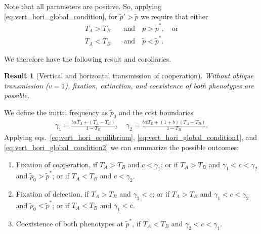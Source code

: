 \documentclass[12pt]{extarticle}
\newtheorem{result}{Result}
\begin{document}
{Note that all parameters are positive.
So, applying \autoref{eq:vert_hori_global_condition}, for $\tilde{p}'>\tilde{p}$ we require that either 
\begin{align} 
\label{eq:vert_hori_global_condition1}
T_A > T_B \quad&\text{and}\quad \tilde{p}>\tilde{p}^*,  \quad \text{or} \\
\label{eq:vert_hori_global_condition2}
T_A <T_B \quad&\text{and}\quad \tilde{p}<\tilde{p}^* .
\end{align}

We therefore have the following result and corollaries.\\

\begin{result}[Vertical and horizontal transmission of cooperation] \label{result:vert_hori}
Without oblique transmission ($v=1$), fixation, extinction, and coexistence of both phenotypes are possible.
\end{result}

We define the initial frequency as $\tilde{p}_0$ and the cost boundaries
\begin{equation}\begin{aligned}
\gamma_1 = \frac{b \alpha T_A + (T_A - T_B)}{1-T_B}, \quad
\gamma_2 = \frac{b \alpha T_B + (1+b) (T_A - T_B)}{1-T_B}.
\end{aligned}\end{equation}
Applying eqs.~\ref{eq:vert_hori_equilibrium}, \ref{eq:vert_hori_global_condition1}, and \ref{eq:vert_hori_global_condition2} we can summarize the possible outcomes:
\begin{enumerate} %
\item Fixation of cooperation,
	if $T_A>T_B$ and $c<\gamma_1$; or
	if $T_A>T_B$ and $\gamma_1<c<\gamma_2$ and $\tilde{p}_0>\tilde{p}^*$; or
	if $T_A<T_B$ and $c<\gamma_2$.
\item Fixation of defection,
	if $T_A>T_B$ and $\gamma_2<c$; or
	if $T_A>T_B$ and $\gamma_1<c<\gamma_2$ and $\tilde{p}_0<\tilde{p}^*$; or
	if $T_A<T_B$ and $\gamma_1<c$.
\item Coexistence of both phenotypes at $\tilde{p}^*$, 
	if $T_A<T_B$ and $\gamma_2<c<\gamma_1$.
\end{enumerate}

}
\end{document}
